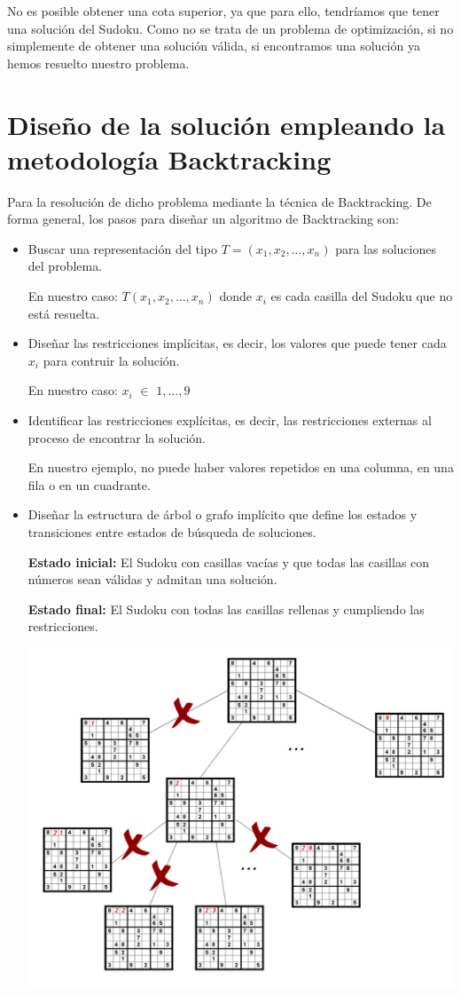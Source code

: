 \documentclass[11pt, a4paper]{article}
\theoremstyle{theorem-style}
\theoremstyle{definition-style}
\theoremstyle{remark-style}
\theoremstyle{example-style}
\begin{document}
No es posible obtener una cota superior, ya que para ello, tendríamos que tener una solución del Sudoku. Como no se trata de un problema de optimización, si no simplemente de obtener una solución válida, si encontramos una solución ya hemos resuelto nuestro problema.

\section{Diseño de la solución empleando la metodología Backtracking}

Para la resolución de dicho problema mediante la técnica de Backtracking. De forma general, los pasos para diseñar un algoritmo de Backtracking son:
\begin{itemize}
\item Buscar una representación del tipo $T=(x_1, x_2, \ldots, x_n)$ para las soluciones del problema.

En nuestro caso: $T(x_1, x_2, \dots, x_n)$ donde $x_i$ es cada casilla del Sudoku que no está resuelta.

\item Diseñar las restricciones implícitas, es decir, los valores que puede tener cada $x_i$ para contruir la solución.

En nuestro caso: $x_i$ $\in$ ${1, \dots, 9}$

\item Identificar las restricciones explícitas, es decir, las restricciones externas al proceso de encontrar la solución.

En nuestro ejemplo, no puede haber valores repetidos en una columna, en una fila o en un cuadrante.


\item Diseñar la estructura de árbol o grafo implícito que define los estados y transiciones entre estados de búsqueda de soluciones.

\textbf{Estado inicial: }El Sudoku con casillas vacías y que todas las casillas con números sean válidas y admitan una solución.
\

\textbf{Estado final: }El Sudoku con todas las casillas rellenas y cumpliendo las restricciones.

\includegraphics[scale=0.3]{Grafo_BackTracking}



\end{itemize}
\end{document}
